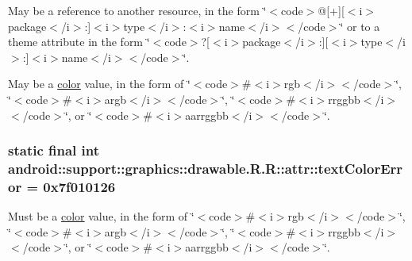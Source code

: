 May be a reference to another resource, in the form \char`\"{}$<$code$>$@\mbox{[}+\mbox{]}\mbox{[}$<$i$>$package$<$/i$>$:\mbox{]}$<$i$>$type$<$/i$>$:$<$i$>$name$<$/i$>$$<$/code$>$\char`\"{} or to a theme attribute in the form \char`\"{}$<$code$>$?\mbox{[}$<$i$>$package$<$/i$>$:\mbox{]}\mbox{[}$<$i$>$type$<$/i$>$:\mbox{]}$<$i$>$name$<$/i$>$$<$/code$>$\char`\"{}. 

May be a \hyperlink{classandroid_1_1support_1_1graphics_1_1drawable_1_1_r_1_1color}{color} value, in the form of \char`\"{}$<$code$>$\#$<$i$>$rgb$<$/i$>$$<$/code$>$\char`\"{}, \char`\"{}$<$code$>$\#$<$i$>$argb$<$/i$>$$<$/code$>$\char`\"{}, \char`\"{}$<$code$>$\#$<$i$>$rrggbb$<$/i$>$$<$/code$>$\char`\"{}, or \char`\"{}$<$code$>$\#$<$i$>$aarrggbb$<$/i$>$$<$/code$>$\char`\"{}. \hypertarget{classandroid_1_1support_1_1graphics_1_1drawable_1_1_r_1_1attr_4da7f8be6b6b9de102aaa3f10f64ca0c}{
\subsubsection[{textColorError}]{\setlength{\rightskip}{0pt plus 5cm}static final int android::support::graphics::drawable.R.R::attr::textColorError = 0x7f010126}}
\label{classandroid_1_1support_1_1graphics_1_1drawable_1_1_r_1_1attr_4da7f8be6b6b9de102aaa3f10f64ca0c}


Must be a \hyperlink{classandroid_1_1support_1_1graphics_1_1drawable_1_1_r_1_1color}{color} value, in the form of \char`\"{}$<$code$>$\#$<$i$>$rgb$<$/i$>$$<$/code$>$\char`\"{}, \char`\"{}$<$code$>$\#$<$i$>$argb$<$/i$>$$<$/code$>$\char`\"{}, \char`\"{}$<$code$>$\#$<$i$>$rrggbb$<$/i$>$$<$/code$>$\char`\"{}, or \char`\"{}$<$code$>$\#$<$i$>$aarrggbb$<$/i$>$$<$/code$>$\char`\"{}. 

